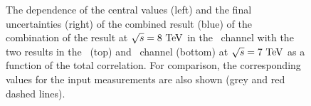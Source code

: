 \begin{figure}[tbp!]
{  \label{sfig:CombValRhoDep7lj8dil}
}
\caption[Stability of the combination for the $\sqrts=7$ and $8$~\TeV\ analyses]{
%
The dependence of the central values (left) and the final uncertainties (right) of the combined result (blue) of the combination of the result at ${\sqrt{s}}=8~\mathrm{TeV}$ in the \dil\ channel with the two results in the \dil\ (top) and \ljets\ channel (bottom) at ${\sqrt{s}}=7~\mathrm{TeV}$ as a function of the total correlation. 
%
For comparison, the corresponding values for the input measurements are also shown (grey and red dashed lines).
%
  \label{fig:combinationrho78}}
\end{figure}


